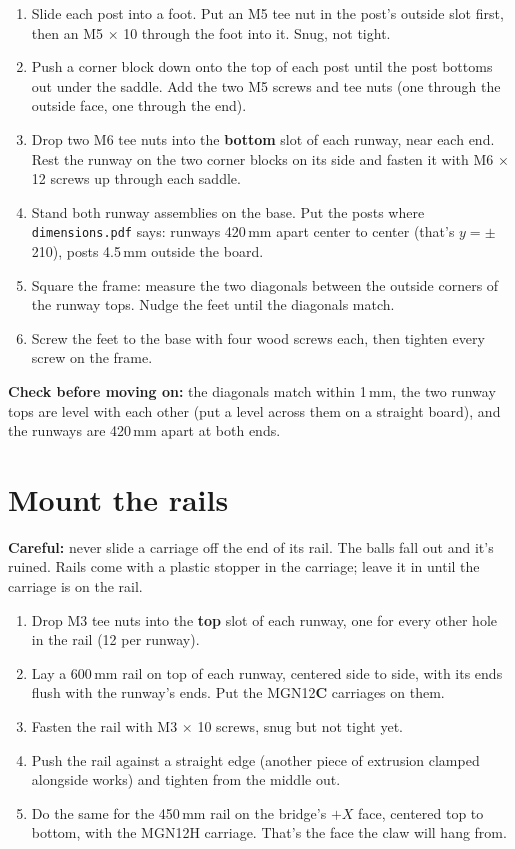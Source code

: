 \documentclass[10pt]{article}
\newcommand{\mm}{\,mm}
\newcommand{\file}[1]{\texttt{#1}}
\newcommand{\gate}[1]{\par\smallskip\noindent\colorbox{okgreen!10}{\parbox{\dimexpr\linewidth-2\fboxsep}{\textcolor{okgreen}{\textbf{Check before moving on:}} #1}}\par\smallskip}
\newcommand{\warn}[1]{\par\smallskip\noindent\colorbox{red!8}{\parbox{\dimexpr\linewidth-2\fboxsep}{\textcolor{red!70!black}{\textbf{Careful:}} #1}}\par\smallskip}
\begin{document}
\begin{enumerate}
  \item Slide each post into a foot. Put an M5 tee nut in the post's outside slot first, then
        an M5 $\times$ 10 through the foot into it. Snug, not tight.
  \item Push a corner block down onto the top of each post until the post bottoms out under the
        saddle. Add the two M5 screws and tee nuts (one through the outside face, one through the end).
  \item Drop two M6 tee nuts into the \textbf{bottom} slot of each runway, near each end. Rest the
        runway on the two corner blocks on its side and fasten it with M6 $\times$ 12 screws up through
        each saddle.
  \item Stand both runway assemblies on the base. Put the posts where \file{dimensions.pdf} says:
        runways 420\mm{} apart center to center (that's $y = \pm$210), posts 4.5\mm{} outside the board.
  \item Square the frame: measure the two diagonals between the outside corners of the
        runway tops. Nudge the feet until the diagonals match.
  \item Screw the feet to the base with four wood screws each, then tighten every screw on the frame.
\end{enumerate}

\gate{the diagonals match within 1\mm, the two runway tops are level with each other (put a
level across them on a straight board), and the runways are 420\mm{} apart at both ends.}

\section{Mount the rails}

\warn{never slide a carriage off the end of its rail. The balls fall out and it's ruined. Rails
come with a plastic stopper in the carriage; leave it in until the carriage is on the rail.}

\begin{enumerate}
  \item Drop M3 tee nuts into the \textbf{top} slot of each runway, one for every other hole
        in the rail (12 per runway).
  \item Lay a 600\mm{} rail on top of each runway, centered side to side, with its ends flush
        with the runway's ends. Put the MGN12\textbf{C} carriages on them.
  \item Fasten the rail with M3 $\times$ 10 screws, snug but not tight yet.
  \item Push the rail against a straight edge (another piece of extrusion clamped alongside works)
        and tighten from the middle out.
  \item Do the same for the 450\mm{} rail on the bridge's $+X$ face, centered top to bottom, with
        the MGN12H carriage. That's the face the claw will hang from.
\end{enumerate}
\end{document}
